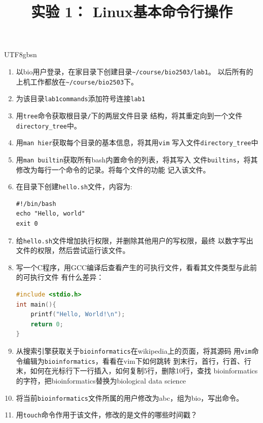 \documentclass[12pt]{article}
\begin{document}
\begin{CJK*}{UTF8}{gbsn}

\title{实验 1： Linux基本命令行操作}
\author{}
\date{}

\maketitle


\begin{enumerate}[(1)]
	\item 以bio用户登录，在家目录下创建目录\lstinline{~/course/bio2503/lab1}。
		以后所有的上机工作都放在\lstinline{~/course/bio2503}下。
	\item 为该目录\lstinline{lab1commands}添加符号连接\lstinline{lab1}
	\item 用\lstinline{tree}命令获取根目录\lstinline{/}下的两层文件目录
		结构，将其重定向到一个文件\lstinline{directory_tree}中。
	\item 用\lstinline{man hier}获取每个目录的基本信息，将其用\lstinline{vim}
		写入文件\lstinline{directory_tree}中
	\item 用\lstinline{man builtin}获取所有bash内置命令的列表，将其写入
		文件\lstinline{builtins}，将其修改为每行一个命令的记录。将每个文件的功能
		记入该文件。
	\item 在目录下创建\lstinline{hello.sh}文件，内容为:  
	\begin{lstlisting}
#!/bin/bash
echo "Hello, world"
exit 0
	\end{lstlisting}
	\item 给\lstinline{hello.sh}文件增加执行权限，并删除其他用户的写权限，最终
		以数字写出文件的权限，然后尝试运行该文件。
	\item 写一个C程序，用GCC编译后查看产生的可执行文件，看看其文件类型与此前的可执行文件
		有什么差异：
	\begin{lstlisting}[language=c]
#include <stdio.h>
int main(){
	printf("Hello, World!\n");
	return 0;
}
	\end{lstlisting}
	\item 从搜索引擎获取关于\texttt{bioinformatics}在wikipedia上的页面，将其源码
		用\lstinline{vim}命令编辑为\lstinline{bioinformatics}，看看在vim下如何跳转
		到末行，首行，行首、行末，如何在光标行下一行插入，如何复制5行，删除10行，查找
		bioinformatics的字符，把bioinformatics替换为biological data science
	\item 将当前\lstinline{bioinformatics}文件所属的用户修改为abc，组为bio，写出命令。
	\item 用\lstinline{touch}命令作用于该文件，修改的是文件的哪些时间戳？

\end{enumerate}
\end{CJK*}
\end{document}
